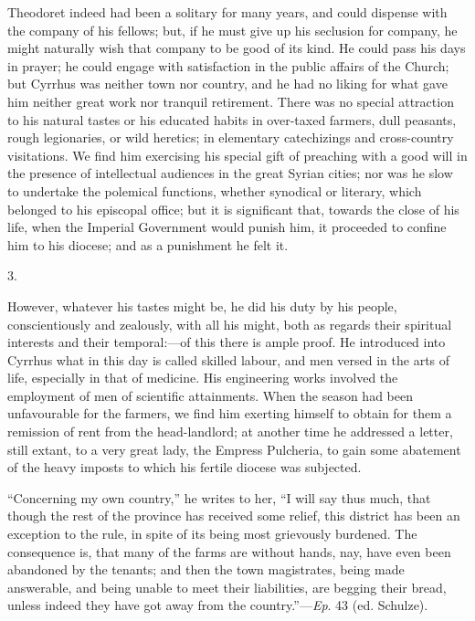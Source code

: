 Theodoret indeed had been a solitary for many years, and could
dispense with the company of his fellows; but, if he must give up his
seclusion for company, he might naturally wish that company to be good
of its kind. He could pass his days in prayer; he could engage with
satisfaction in the public affairs of the Church; but Cyrrhus was
neither town nor country, and he had no liking for what gave him
neither great work nor tranquil retirement. There was no special
attraction to his natural tastes or his educated habits in
over-taxed farmers, dull peasants, rough legionaries, or wild
heretics; in elementary catechizings and cross-country visitations. We
find him exercising his special gift of preaching with a good will in
the presence of intellectual audiences in the great Syrian cities; nor
was he slow to undertake the polemical functions, whether synodical or
literary, which belonged to his episcopal office; but it is
significant that, towards the close of his life, when the Imperial
Government would punish him, it proceeded to confine him to his
diocese; and as a punishment he felt it.

3.

However, whatever his tastes might be, he did his duty by his
people, conscientiously and zealously, with all his might, both as
regards their spiritual interests and their temporal:—of this there
is ample proof. He introduced into Cyrrhus what in this day is called
skilled labour, and men versed in the arts of life, especially in that
of medicine. His engineering works involved the employment of men of
scientific attainments. When the season had been unfavourable for the
farmers, we find him exerting himself to obtain for them a remission
of rent from the head-landlord; at another time he addressed a letter,
still extant, to a very great lady, the Empress Pulcheria, to gain
some abatement of the heavy imposts to which his fertile diocese was
subjected.

``Concerning my own country,'' he writes to her, ``I
will say thus much, that though the rest of the province has received
some relief, this district has been an exception to the rule, in spite
of its being most grievously burdened. The consequence is, that many
of the farms are without hands, nay, have even been abandoned by the
tenants; and then the town magistrates, being made answerable,
and being unable to meet their liabilities, are
begging their bread, unless indeed they have got away from the
country.''—\emph{Ep}. 43 (ed. Schulze).

